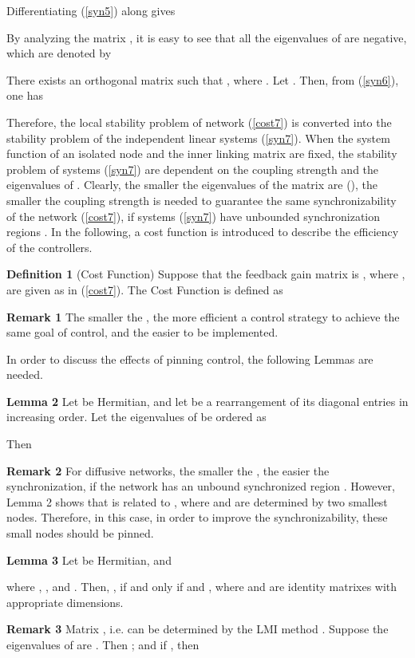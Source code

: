 \documentclass[11pt]{article}
\def\dref#1{(\ref{#1})}
\begin{document}
Differentiating \dref{syn5} along  gives

By analyzing the matrix , it is easy to see that all
the eigenvalues of  are negative, which are denoted by

There exists an orthogonal matrix  such that
, where
. Let
. Then, from \dref{syn6}, one has

Therefore, the local stability problem of network \dref{cost7} is
converted into the stability problem of the  independent linear
systems \dref{syn7}. When the system function of an isolated node
and the inner linking matrix  are fixed, the stability
problem of systems \dref{syn7} are dependent on the coupling
strength  and the eigenvalues of . Clearly, the
smaller the eigenvalues of the matrix  are
(), the smaller the coupling strength
 is needed to guarantee the same synchronizability of the
network \dref{cost7}, if systems \dref{syn7} have unbounded
synchronization regions \cite{jia52}. In the following, a cost
function is introduced to describe the efficiency of the
controllers.

\textbf {Definition 1} (Cost Function) Suppose that the feedback
gain matrix is  ,
where , are given as in
\dref{cost7}. The Cost Function is defined as


\textbf {Remark 1} The smaller the , the more efficient a
control strategy to achieve the same goal of control, and the easier
to be implemented.

In order to discuss the effects of pinning control, the following
Lemmas are needed.

\textbf {Lemma 2} \cite{horn85} Let  be
Hermitian, and let  be a
rearrangement of its diagonal entries in increasing order. Let the
eigenvalues of  be ordered as

Then


\textbf {Remark 2} For diffusive networks, the smaller the
, the easier the synchronization, if the network has an
unbound synchronized region \cite{jia52}. However, Lemma 2 shows
that  is related to , where  and
 are determined by two smallest nodes. Therefore, in this
case, in order to improve the synchronizability, these small nodes
should be pinned.

\textbf {Lemma 3} Let  be Hermitian, and

where , ,  and
. Then,
, if and only if 
and , where
 and  are identity matrixes with appropriate dimensions.

\textbf {Remark 3} Matrix , i.e.  can be
determined by the LMI method \cite{Lmi}. Suppose the eigenvalues of
 are . Then
; and if , then
\end{document}
